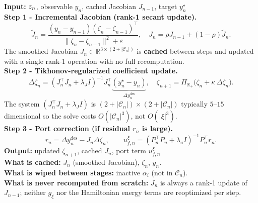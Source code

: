 \vspace{6pt}

\begin{mdframed}[linecolor=violet!70!black, linewidth=1pt,
                 frametitle={\small\sffamily\bfseries
                 Box 3.6.3: \textsc{OnlineCoeffUpdate}}]
\label{box:online}
\textbf{Input:} $z_n$, observable $y_n$,
cached Jacobian $J_{n-1}$, target $y_n^\star$\\[3pt]
\textbf{Step 1 - Incremental Jacobian (rank-1 secant update).}
\begin{equation}
  \tilde{J}_n
  = \frac{(y_n - y_{n-1})(\zeta_n - \zeta_{n-1})^\top}
         {\|\zeta_n - \zeta_{n-1}\|^2 + \varepsilon},
  \quad
  J_n = \rho J_{n-1} + (1-\rho)\tilde{J}_n.
  \label{eq:ch3:jacobian}
\end{equation}
The smoothed Jacobian $J_n \in \mathbb{R}^{3\times(2+|\mathcal{C}_n|)}$
is \textbf{cached} between steps and updated with a single rank-1
operation with no full recomputation.\\[3pt]
\textbf{Step 2 - Tikhonov-regularized coefficient update.}
\begin{equation}
  \Delta\zeta_n
  = (J_n^\top J_n + \lambda_J I)^{-1}
    J_n^\top\underbrace{(y_n^\star - y_n)}_{\Delta y^{\mathrm{des}}_n},
  \quad
  \zeta_{n+1}
  = \Pi_{\mathbb{R}_+}\bigl(\zeta_n + \kappa\,\Delta\zeta_n\bigr).
  \label{eq:ch3:coeff_update}
\end{equation}
The system $(J_n^\top J_n + \lambda_J I)$ is
$(2+|\mathcal{C}_n|)\times(2+|\mathcal{C}_n|)$ typically $5$--$15$
dimensional so the solve costs $O(|\mathcal{C}_n|^3)$, not $O(|\xi|^3)$.\\[3pt]
\textbf{Step 3 - Port correction (if residual $r_n$ is large).}
\begin{equation}
  r_n = \Delta y^{\mathrm{des}}_n - J_n\Delta\zeta_n,
  \qquad
  u_{f,n}^\xi
  = (P_n^\top P_n + \lambda_u I)^{-1} P_n^\top r_n.
  \label{eq:ch3:port_update}
\end{equation}
\textbf{Output:} updated $\zeta_{n+1}$, cached $J_n$, port term $u_{f,n}^\xi$\\
\textbf{What is cached:} $J_n$ (smoothed Jacobian), $\zeta_n$, $y_n$.\\
\textbf{What is wiped between stages:} inactive $\alpha_i$ (not in $\mathcal{C}_n$).\\
\textbf{What is never recomputed from scratch:} $J_n$ is always a rank-1
update of $J_{n-1}$; neither $g_\xi$ nor the Hamiltonian energy terms
are reoptimized per step.
\end{mdframed}

